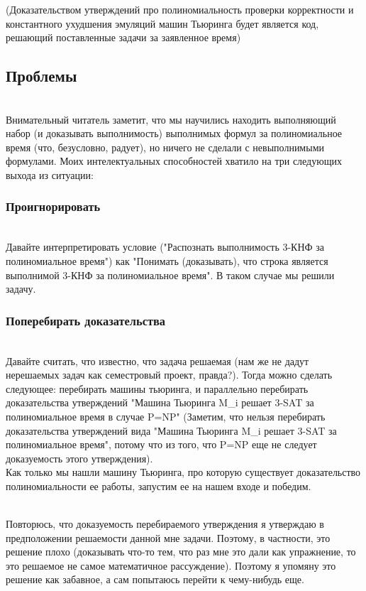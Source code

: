 \documentclass{amsart}
\theoremstyle{definition}
\theoremstyle{remark}
\numberwithin{equation}{section}
\begin{document}
(Доказательством утверждений про полиномиальность проверки корректности и
константного ухудшения эмуляций машин Тьюринга будет является код, решающий
поставленные задачи за заявленное время)


\subsection{Проблемы}\\


Внимательный читатель заметит, что мы научились находить выполняющий набор
(и доказывать выполнимость) выполнимых формул за полиномиальное время (что,
безусловно, радует), но ничего не сделали с невыполнимыми формулами. Моих
интелектуальных способностей хватило на три следующих выхода из ситуации:


\subsubsection{Проигнорировать}\\


Давайте интерпретировать условие ("Распознать выполнимость 3-КНФ за
полиномиальное время") как "Понимать (доказывать), что строка является
выполнимой 3-КНФ за полиномиальное время". В таком случае мы решили задачу.

\subsubsection{Поперебирать доказательства}\\


Давайте считать, что известно, что задача решаемая (нам же не дадут нерешаемых
задач как семестровый проект, правда?). Тогда можно сделать следующее:
перебирать машины тьюринга, и параллельно перебирать
доказательства утверждений "Машина Тьюринга M_i решает 3-SAT за полиномиальное
время в случае P=NP" (Заметим, что нельзя перебирать доказательства утверждений
вида  "Машина Тьюринга M_i решает 3-SAT за полиномиальное время",
потому что из того, что P=NP еще не следует доказуемость этого утверждения).
\\


Как только мы нашли машину Тьюринга, про которую существует доказательство
полиномиальности ее работы, запустим ее на нашем входе и победим.

\\

Повторюсь, что доказуемость перебираемого утверждения я утверждаю в
предположении решаемости данной мне задачи. Поэтому, в частности, это решение
плохо (доказывать что-то тем, что раз мне это дали как упражнение, то это
решаемое не самое математичное рассуждение). Поэтому я упомяну это решение как
забавное, а сам попытаюсь перейти к чему-нибудь еще.
\end{document}
